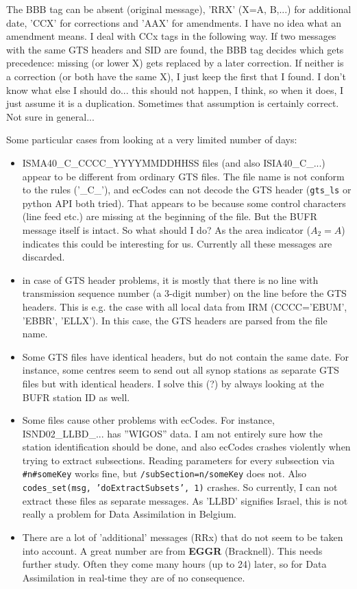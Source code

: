 \documentclass[10pt]{article}
\begin{document}
The BBB tag can be absent (original message), 'RRX' (X=A, B,...) for additional date, 'CCX' for corrections and 'AAX' for amendments. I have no idea what an amendment means. I deal with CCx tags in the following way. If two messages with the same GTS headers and SID are found, the BBB tag decides which gets precedence: missing (or lower X) gets replaced by a later correction. If neither is a correction (or both have the same X), I just keep the first that I found. I don't know what else I should do... this should not happen, I think, so when it does, I just assume it is a duplication. Sometimes that assumption is certainly correct. Not sure in general...


Some particular cases from looking at a very limited number of days:
\begin{itemize}
\item ISMA40\_C\_CCCC\_YYYYMMDDHHSS files (and also ISIA40\_C\_...) appear to be different from ordinary GTS files. The file name is not conform to the rules ('\_C\_'), and ecCodes can not decode the GTS header (\texttt{gts\_ls} or python API both tried). That appears to be because some control characters (line feed etc.) are missing at the beginning of the file. But the BUFR message itself is intact. So what should I do? As the area indicator ($A_2 =  A$) indicates this could be interesting for us. Currently all these messages are discarded.
\item in case of GTS header problems, it is mostly that there is no line with transmission sequence number (a 3-digit number) on the line before the GTS headers. This is e.g. the case with all local data from IRM (CCCC='EBUM', 'EBBR', 'ELLX'). In this case, the GTS headers are parsed from the file name.
\item Some GTS files have identical headers, but do not contain the same date. For instance, some centres seem to send out all synop stations as separate GTS files but with identical headers. I solve this (?) by always looking at the BUFR station ID as well.
\item Some files cause other problems with ecCodes. For instance, ISND02\_LLBD\_... has ''WIGOS'' data. I am not entirely sure how the station identification should be done, and also ecCodes crashes violently when trying to extract subsections. Reading parameters for every subsection via \texttt{\#n\#someKey} works fine, but \texttt{/subSection=n/someKey} does not. Also \texttt{codes\_set(msg, 'doExtractSubsets', 1)} crashes. So currently, I can not extract these files as separate messages. As 'LLBD' signifies Israel, this is not really a problem for Data Assimilation in Belgium.
\item There are a lot of 'additional' messages (RRx) that do not seem to be taken into account. A great number are from \textbf{EGGR} (Bracknell). This needs further study. Often they come many hours (up to 24)  later, so for Data Assimilation in real-time they are of no consequence.
\end{itemize}
\end{document}
